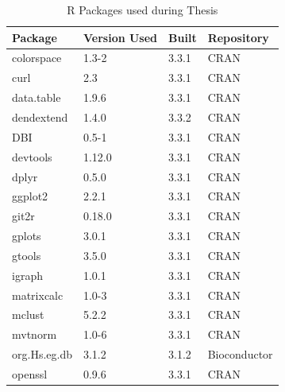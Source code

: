 \begin{longtable}{llll}
\caption{R Packages used during Thesis}
\label{tab:computers_r_packages}
\\
\multicolumn{1}{l}{\bfseries Package}      & \multicolumn{1}{l}{\bfseries Version Used} & \multicolumn{1}{l}{\bfseries Built} & \multicolumn{1}{l}{\bfseries Repository}      \\
\hline  \rowcolor{black!10}
colorspace   & 1.3-2          & 3.3.1 & CRAN            \\
\rowcolor{black!5}
curl         & 2.3            & 3.3.1 & CRAN            \\
\rowcolor{black!10}
data.table   & 1.9.6          & 3.3.1 & CRAN            \\
\rowcolor{black!5}
dendextend   & 1.4.0          & 3.3.2 & CRAN            \\
\rowcolor{black!10}
DBI          & 0.5-1          & 3.3.1 & CRAN            \\
\rowcolor{black!5}
devtools     & 1.12.0         & 3.3.1 & CRAN            \\
\rowcolor{black!10}
dplyr        & 0.5.0          & 3.3.1 & CRAN            \\
\rowcolor{black!5}
ggplot2      & 2.2.1          & 3.3.1 & CRAN            \\
\rowcolor{black!10}
git2r        & 0.18.0         & 3.3.1 & CRAN            \\
\rowcolor{black!5}
gplots       & 3.0.1          & 3.3.1 & CRAN            \\
\rowcolor{black!10}
gtools       & 3.5.0          & 3.3.1 & CRAN            \\
\rowcolor{black!5}
igraph       & 1.0.1          & 3.3.1 & CRAN            \\
\rowcolor{black!10}
matrixcalc   & 1.0-3          & 3.3.1 & CRAN            \\
\rowcolor{black!5}
mclust       & 5.2.2          & 3.3.1 & CRAN            \\
\rowcolor{black!10}
mvtnorm      & 1.0-6          & 3.3.1 & CRAN            \\
\rowcolor{black!5}
org.Hs.eg.db & 3.1.2          & 3.1.2 & Bioconductor    \\
\rowcolor{black!10}
openssl      & 0.9.6          & 3.3.1 & CRAN            \\

\end{longtable}
